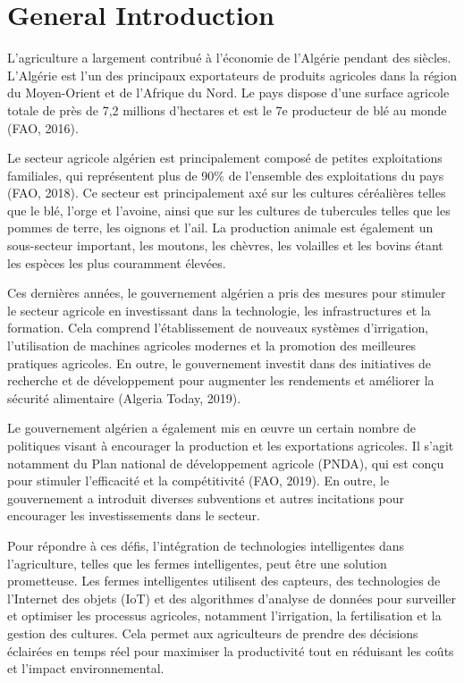 \chapter*{General Introduction} 
\label{chap:introduction} 

L'agriculture a largement contribué à l'économie de l'Algérie pendant des siècles. L'Algérie est l'un des principaux exportateurs de produits agricoles dans la région du Moyen-Orient et de l'Afrique du Nord. Le pays dispose d'une surface agricole totale de près de 7,2 millions d'hectares et est le 7e producteur de blé au monde (FAO, 2016).

Le secteur agricole algérien est principalement composé de petites exploitations familiales, qui représentent plus de 90\% de l'ensemble des exploitations du pays (FAO, 2018). Ce secteur est principalement axé sur les cultures céréalières telles que le blé, l'orge et l'avoine, ainsi que sur les cultures de tubercules telles que les pommes de terre, les oignons et l'ail. La production animale est également un sous-secteur important, les moutons, les chèvres, les volailles et les bovins étant les espèces les plus couramment élevées.

Ces dernières années, le gouvernement algérien a pris des mesures pour stimuler le secteur agricole en investissant dans la technologie, les infrastructures et la formation. Cela comprend l'établissement de nouveaux systèmes d'irrigation, l'utilisation de machines agricoles modernes et la promotion des meilleures pratiques agricoles. En outre, le gouvernement investit dans des initiatives de recherche et de développement pour augmenter les rendements et améliorer la sécurité alimentaire (Algeria Today, 2019).

Le gouvernement algérien a également mis en œuvre un certain nombre de politiques visant à encourager la production et les exportations agricoles. Il s'agit notamment du Plan national de développement agricole (PNDA), qui est conçu pour stimuler l'efficacité et la compétitivité (FAO, 2019). En outre, le gouvernement a introduit diverses subventions et autres incitations pour encourager les investissements dans le secteur.


Pour répondre à ces défis, l'intégration de technologies intelligentes dans l'agriculture, telles que les fermes intelligentes, peut être une solution prometteuse. Les fermes intelligentes utilisent des capteurs, des technologies de l'Internet des objets (IoT) et des algorithmes d'analyse de données pour surveiller et optimiser les processus agricoles, notamment l'irrigation, la fertilisation et la gestion des cultures. Cela permet aux agriculteurs de prendre des décisions éclairées en temps réel pour maximiser la productivité tout en réduisant les coûts et l'impact environnemental.



